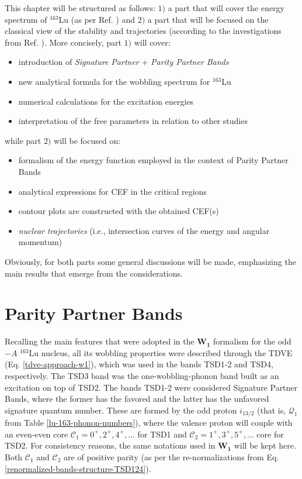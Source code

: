 This chapter will be structured as follows: $1)$ a part that will cover the energy spectrum of $^{163}$Lu (as per Ref. \cite{poenaru2021extensive1}) and $2)$ a part that will be focused on the classical view of the stability and trajectories (according to the investigations from Ref. \cite{poenaru2021extensive2}). More concisely, part $1)$ will cover:
\begin{itemize}
    \item introduction of \emph{Signature Partner} + \emph{Parity Partner Bands}
    \item new analytical formula for the wobbling spectrum for $^{163}$Lu
    \item numerical calculations for the excitation energies
    \item interpretation of the free parameters in relation to other studies
\end{itemize}
while part $2)$ will be focused on:
\begin{itemize}
    \item formalism of the energy function employed in the context of Parity Partner Bands
    \item analytical expressions for CEF in the critical regions
    \item contour plots are constructed with the obtained CEF(s)
    \item \emph{nuclear trajectories} (i.e., intersection curves of the energy and angular momentum) 
\end{itemize}

Obviously, for both parts some general discussions will be made, emphasizing the main results that emerge from the considerations.

\section{Parity Partner Bands}
\label{parity-partners-renormalizaion}

Recalling the main features that were adopted in the $\mathbf{W_1}$ formalism for the odd$-A$ $^{163}$Lu nucleus, all its wobbling properties were described through the TDVE (Eq. \ref{tdve-approach-w1}), which was used in the bands TSD1-2 and TSD4, respectively. The TSD3 band was the one-wobbling-phonon band built as an excitation on top of TSD2. The bands TSD1-2 were considered Signature Partner Bands, where the former has the favored and the latter has the unfavored signature quantum number. These are formed by the odd proton $i_{13/2}$ (that is, $\mathcal{Q}_1$ from Table \ref{lu-163-phonon-numbers}), where the valence proton will couple with an even-even core $\mathscr{C}_1=0^+,2^+,4^+,\dots$ for TSD1 and $\mathscr{C}_2=1^+,3^+,5^+,\dots$ core for TSD2. For consistency reasons, the same notations used in $\mathbf{W_1}$ will be kept here. Both $\mathscr{C}_1$ and $\mathscr{C}_2$ are of positive parity (as per the re-normalizations from Eq. \ref{renormalized-bands-structure-TSD124}).

